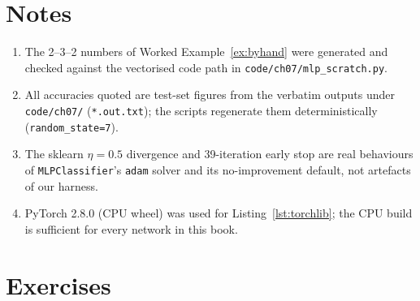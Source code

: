\section*{Notes}
\begin{enumerate}
\item[\textbf{1.}] The 2--3--2 numbers of Worked Example~\ref{ex:byhand}
were generated and checked against the vectorised code path in
\texttt{code/ch07/mlp\_scratch.py}.
\item[\textbf{2.}] All accuracies quoted are test-set figures from the
verbatim outputs under \texttt{code/ch07/} (\texttt{*.out.txt}); the
scripts regenerate them deterministically (\texttt{random\_state=7}).
\item[\textbf{3.}] The sklearn $\eta=0.5$ divergence and 39-iteration
early stop are real behaviours of \texttt{MLPClassifier}'s \texttt{adam}
solver and its no-improvement default, not artefacts of our harness.
\item[\textbf{4.}] PyTorch 2.8.0 (CPU wheel) was used for
Listing~\ref{lst:torchlib}; the CPU build is sufficient for every
network in this book.
\end{enumerate}

\section{Exercises}
\label{sec:nnexercises}

